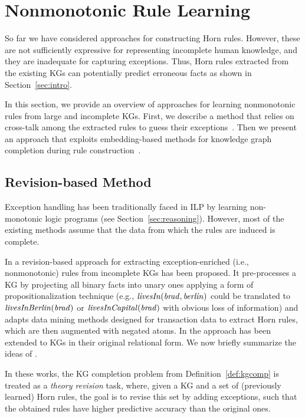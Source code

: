 \section{Nonmonotonic Rule Learning}\label{sec:nmrulelearn}
So far we have considered approaches for constructing Horn rules. However,  these are not sufficiently expressive for representing incomplete human knowledge, and they are inadequate for capturing
exceptions. Thus, Horn rules extracted from the existing KGs can potentially %
predict erroneous facts as shown in Section~\ref{sec:intro}. 

In this section, we provide an overview of approaches for learning nonmonotonic rules from large and incomplete KGs. First, we describe a method that relies on cross-talk among the extracted rules to guess their exceptions~\cite{gad2016,rumis}. Then we present an approach that exploits embedding-based methods for knowledge graph completion during rule construction~\cite{thinh2018}.

\subsection{Revision-based Method}
Exception handling has been traditionally faced in ILP by learning non-monotonic logic programs \cite{DBLP:conf/ijcai/InoueK97,DBLP:journals/tocl/Sakama05,XHAIL,CorapiRL10,ILASP_system} (see Section~\ref{sec:reasoning}). However, most of the existing methods assume that the data from which the rules are induced is complete.

In \cite{gad2016} a revision-based approach for extracting exception-enriched (i.e., nonmonotonic) rules from incomplete KGs has been proposed. 
It pre-processes a KG by %
projecting all binary facts into unary ones applying a form of propositionalization technique \cite{propos} (e.g., $\mathit{livesIn(brad,berlin)}$ could be translated to $\mathit{livesInBerlin(brad)}$ or $\mathit{livesInCapital(brad)}$ with obvious loss of information) and adapts data mining methods designed for transaction data to extract Horn rules, which are then augmented with negated atoms. In \cite{rumis} the approach has been extended to KGs in their original relational form. We now briefly summarize the ideas of  \cite{gad2016,rumis}.

In these works, the KG completion problem from Definition~\ref{def:kgcomp} is treated 
as a \emph{theory revision} task, where, given a KG and a set of (previously learned) Horn rules, the goal is to revise this set by adding exceptions, such that the obtained rules have higher predictive accuracy than the original ones. 

